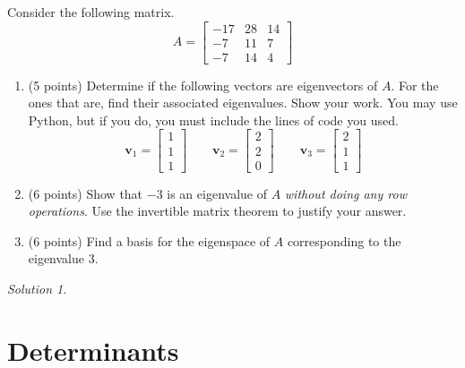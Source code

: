\documentclass{article}
\theoremstyle{remark}
\newtheorem*{solution}{Solution}
\newcommand{\vv}[1]{\mathbf{#1}}
\begin{document}
Consider the following matrix.
\begin{displaymath}
  A =
  \begin{bmatrix}
    -17 & 28 & 14 \\
    -7 & 11 & 7 \\
    -7 & 14 & 4
  \end{bmatrix}
\end{displaymath}
\begin{enumerate}
\item (5 points)
  Determine if the following vectors are eigenvectors of $A$. For the ones that are, find their associated eigenvalues. Show your work. You may use Python, but if you do, you must include the lines of code you used.
  \begin{displaymath}
    \vv v_1 =
    \begin{bmatrix}
      1 \\ 1 \\ 1
    \end{bmatrix}
    \qquad
    \vv v_2 =
    \begin{bmatrix}
      2 \\ 2 \\ 0
    \end{bmatrix}
    \qquad
    \vv v_3 =
    \begin{bmatrix}
      2 \\ 1 \\ 1
    \end{bmatrix}
  \end{displaymath}
\item (6 points)
  Show that $-3$ is an eigenvalue of $A$ \textit{without doing any row operations}.
  Use the invertible matrix theorem to justify your answer.
\item (6 points)
  Find a basis for the eigenspace of $A$ corresponding to the eigenvalue $3$.
\end{enumerate}

\medskip

\begin{solution}
\end{solution}

\pagebreak
\section{Determinants}
\end{document}
